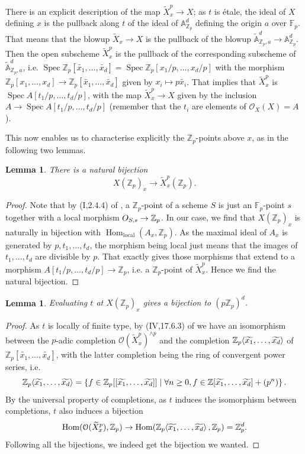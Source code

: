 \documentclass[12pt]{article}
\newcommand{\A}{\mathbb{A}}
\newcommand{\Z}{\mathbb{Z}}
\renewcommand{\O}{\mathcal{O}}
\newcommand{\F}{\mathbb{F}}
\renewcommand{\angle}[1]{\hspace{-2pt}\left\langle #1 \right\rangle}
\DeclareMathOperator{\Hom}{Hom}
\DeclareMathOperator{\Spec}{Spec}
\theoremstyle{plain}
\newtheorem{lem}[thm]{Lemma} %
\theoremstyle{definition}
\theoremstyle{remark}
\begin{document}
There is an explicit description of the map $\widetilde{X}_x^p \to X$; as $t$ is \'etale, the ideal of $X$ defining $x$ is the pullback along $t$ of the ideal of $\A^d_{\Z_p}$ defining the origin $a$ over $\F_p$. That means that the blowup $\widetilde{X}_x \to X$ is the pullback of the blowup $\widetilde{\A}^d_{\Z_p,a} \to \A_{\Z_p}^d$. Then the open subscheme $\widetilde{X}_x^p$ is the pullback of the corresponding subscheme of $\widetilde{\A}^d_{\Z_p,a}$, i.e. $\Spec \Z_p[\widetilde{x_1},\dots,\widetilde{x_d}] = \Spec \Z_p[x_1/p,\dots,x_d/p]$ with the morphism $\Z_p[x_1,\dots,x_d] \to \Z_p[\widetilde{x_1},\dots,\widetilde{x_d}]$ given by $x_i \mapsto p\widetilde{x_i}$. That implies that $\widetilde{X}_x^p$ is $\Spec A[t_1/p,\dots,t_d/p]$, with the map $\widetilde{X}_x^p \to X$ given by the inclusion $A \to \Spec A[t_1/p,\dots,t_d/p]$ (remember that the $t_i$ are elements of $\O_X(X) = A$).

This now enables us to characterise explicitly the $\Z_p$-points above $x$, as in the following two lemmas.

\begin{lem}
There is a natural bijection \[X(\Z_p)_x \to \widetilde{X}_x^p(\Z_p).\]
\end{lem}
\begin{proof}
Note that by (I,2.4.4) of \cite{ega}, a $\Z_p$-point of a scheme $S$ is just an $\F_p$-point $s$ together with a local morphism $\\O_{S,s} \to \Z_p$. In our case, we find that $X(\Z_p)_x$ is naturally in bijection with $\Hom_{\text{local}}(A_x,\Z_p)$. As the maximal ideal of $A_x$ is generated by $p,t_1,\dots,t_d$, the morphism being local just means that the images of $t_1,\dots,t_d$ are divisible by $p$. That exactly gives those morphisms that extend to a morphism $A[t_1/p,\dots,t_d/p] \to \Z_p$, i.e. a $\Z_p$-point of $\widetilde{X}_x^p$. Hence we find the natural bijection.
\end{proof}

\begin{lem}
Evaluating $t$ at $X(\Z_p)_x$ gives a bijection to $(p\Z_p)^d$.
\end{lem}
\begin{proof}
As $t$ is locally of finite type, by (IV,17.6.3) of \cite{ega} we have an isomorphism between the $p$-adic completion $\O(\widetilde{X}_x^p)^{\wedge p}$ and the completion $\Z_p\angle{\widetilde{x_1},\dots, \widetilde{x_d}}$ of $\Z_p[\widetilde{x_1},\dots,\widetilde{x_d}]$, with the latter completion being the ring of convergent power series, i.e.
\[
\Z_p\angle{\widetilde{x_1},\dots, \widetilde{x_d}} = \left\{f \in \Z_p[[\widetilde{x_1},\dots,\widetilde{x_d}]] \mid \forall n \geq 0, f \in \Z[\widetilde{x_1},\dots,\widetilde{x_d}] + (p^n) \right\}.
\]
By the universal property of completions, as $t$ induces the isomorphism between completions, $t$ also induces a bijection $$\Hom(\O(\widetilde{X}_x^p), \Z_p) \to \Hom(\Z_p\angle{\widetilde{x_1},\dots,\widetilde{x_d}},\Z_p) = \Z_p^d.$$ Following all the bijections, we indeed get the bijection we wanted.
\end{proof}
\end{document}
